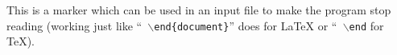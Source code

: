 
This is a marker which can be used in an input file to make the
program stop reading (working just like ``{\tt
$\backslash$end\{document\}}'' does for \LaTeX{} or ``{\tt
$\backslash$end} for \TeX{}).


